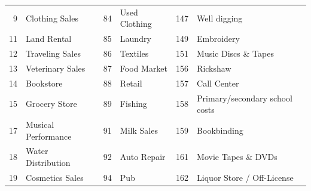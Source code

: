 \begin{longtable}[]{|r|l|r|l|r|l|}
	9                                 & Clothing Sales                     & 84                                & Used Clothing                      & 147                               & Well digging                       \\
	11                                & Land Rental                        & 85                                & Laundry                            & 149                               & Embroidery                         \\
	12                                & Traveling Sales                    & 86                                & Textiles                           & 151                               & Music Discs \& Tapes               \\
	13                                & Veterinary Sales                   & 87                                & Food Market                        & 156                               & Rickshaw                           \\
	14                                & Bookstore                          & 88                                & Retail                             & 157                               & Call Center                        \\
	15                                & Grocery Store                      & 89                                & Fishing                            & 158                               & Primary/secondary school
	costs                                                                                                                                                                                                                    \\
	17                                & Musical Performance                & 91                                & Milk Sales                         & 159                               & Bookbinding                        \\
	18                                & Water Distribution                 & 92                                & Auto Repair                        & 161                               & Movie Tapes \&
	DVDs                                                                                                                                                                                                                     \\
	19                                & Cosmetics Sales                    & 94                                & Pub                                & 162                               & Liquor Store / Off-License         \\

\end{longtable}
